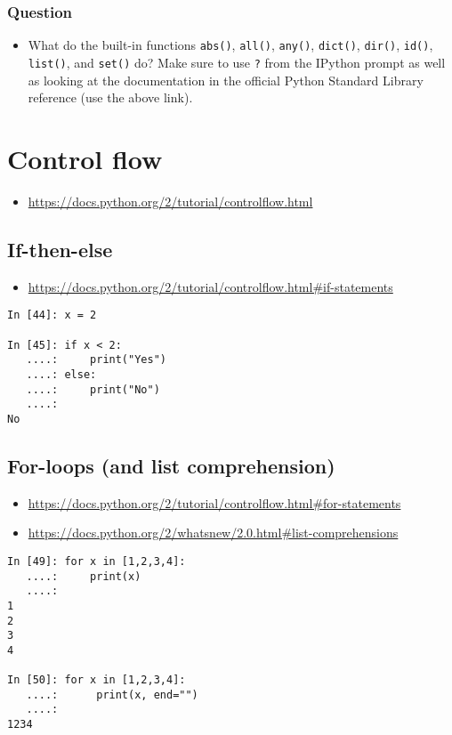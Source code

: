 \subsubsection{Question}
\begin{itemize}
\item What do the built-in functions \texttt{abs()}, \texttt{all()},
  \texttt{any()}, \texttt{dict()}, \texttt{dir()}, \texttt{id()},
  \texttt{list()}, and \texttt{set()} do?  Make sure to use
  \texttt{?} from the IPython prompt as well as looking at the documentation
  in the official Python Standard Library reference (use the above link).
\end{itemize}

\section{Control flow}
\begin{itemize}
\item \url{https://docs.python.org/2/tutorial/controlflow.html}
\end{itemize}

\subsection{If-then-else}
\begin{itemize}
\item \url{https://docs.python.org/2/tutorial/controlflow.html#if-statements}
\end{itemize}

\begin{verbatim}
In [44]: x = 2

In [45]: if x < 2:
   ....:     print("Yes")
   ....: else:
   ....:     print("No")
   ....:     
No
\end{verbatim}

\subsection{For-loops (and list comprehension)}
\begin{itemize}
\item \url{https://docs.python.org/2/tutorial/controlflow.html#for-statements}
\item \url{https://docs.python.org/2/whatsnew/2.0.html#list-comprehensions}
\end{itemize}

\begin{verbatim}
In [49]: for x in [1,2,3,4]:
   ....:     print(x)
   ....:     
1
2
3
4

In [50]: for x in [1,2,3,4]:
   ....:      print(x, end="")
   ....:     
1234
\end{verbatim}

